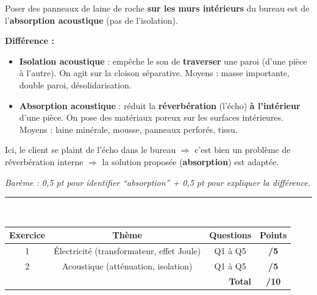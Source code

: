 \documentclass[a4paper,11pt]{article}
\begin{document}
\begin{corrbox}
Poser des panneaux de laine de roche \textbf{sur les murs intérieurs} du bureau est de l'\textbf{absorption acoustique} (pas de l'isolation).

\textbf{Différence :}
\begin{itemize}[nosep]
  \item \textbf{Isolation acoustique} : empêche le son de \textbf{traverser} une paroi (d'une pièce à l'autre). On agit sur la cloison séparative. Moyens : masse importante, double paroi, désolidarisation.
  \item \textbf{Absorption acoustique} : réduit la \textbf{réverbération} (l'écho) \textbf{à l'intérieur} d'une pièce. On pose des matériaux poreux sur les surfaces intérieures. Moyens : laine minérale, mousse, panneaux perforés, tissu.
\end{itemize}

Ici, le client se plaint de l'écho dans le bureau $\Rightarrow$ c'est bien un problème de réverbération interne $\Rightarrow$ la solution proposée (\textbf{absorption}) est adaptée.

\smallskip
\textit{Barème : 0,5 pt pour identifier ``absorption'' + 0,5 pt pour expliquer la différence.}
\end{corrbox}

\vfill

\begin{center}
\textcolor{rouge}{\rule{12cm}{1pt}}\\[8pt]
\begin{tabular}{|c|c|c|c|}
\hline
\textbf{Exercice} & \textbf{Thème} & \textbf{Questions} & \textbf{Points} \\
\hline
1 & Électricité (transformateur, effet Joule) & Q1 à Q5 & \textbf{/5} \\
\hline
2 & Acoustique (atténuation, isolation) & Q1 à Q5 & \textbf{/5} \\
\hline
\multicolumn{3}{|r|}{\textbf{Total}} & \textbf{/10} \\
\hline
\end{tabular}
\end{center}
\end{document}
